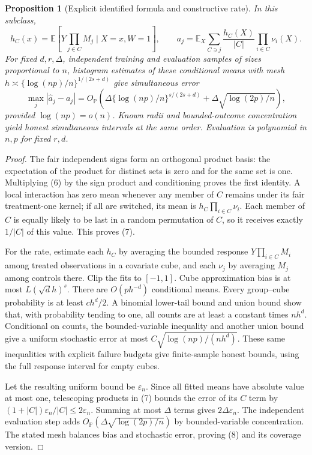 \documentclass[11pt,a4paper]{article}
\newtheorem{proposition}[theorem]{Proposition}
\theoremstyle{definition}
\theoremstyle{remark}
\newcommand{\E}{\mathbb E}
\newcommand{\Prb}{\mathbb P}
\begin{document}
\begin{proposition}[Explicit identified formula and constructive rate]
In this subclass,
\[
 h_C(x)=\E\left[Y\prod_{j\in C}M_j\mid X=x,W=1\right],
 \qquad
 a_j=\E_X\sum_{C\ni j}\frac{h_C(X)}{|C|}\prod_{i\in C}\nu_i(X).
 \tag{7}
\]
For fixed $d,r,\Delta$, independent training and evaluation samples of sizes proportional to $n$, histogram estimates of these conditional means with mesh
$h\asymp\{\log(np)/n\}^{1/(2s+d)}$ give simultaneous error
\[
 \max_j|\hat a_j-a_j|
 =O_{\Prb}\left(\Delta\{\log(np)/n\}^{s/(2s+d)}
       +\Delta\sqrt{\log(2p)/n}\right),
 \tag{8}
\]
provided $\log(np)=o(n)$. Known radii and bounded-outcome concentration yield honest simultaneous intervals at the same order. Evaluation is polynomial in $n,p$ for fixed $r,d$.
\end{proposition}
\begin{proof}
The fair independent signs form an orthogonal product basis: the expectation of the product for distinct sets is zero and for the same set is one. Multiplying (6) by the sign product and conditioning proves the first identity. A local interaction has zero mean whenever any member of $C$ remains under its fair treatment-one kernel; if all are switched, its mean is $h_C\prod_{i\in C}\nu_i$. Each member of $C$ is equally likely to be last in a random permutation of $C$, so it receives exactly $1/|C|$ of this value. This proves (7).

For the rate, estimate each $h_C$ by averaging the bounded response $Y\prod_{i\in C}M_i$ among treated observations in a covariate cube, and each $\nu_j$ by averaging $M_j$ among controls there. Clip the fits to $[-1,1]$. Cube approximation bias is at most $L(\sqrt d h)^s$. There are $O(ph^{-d})$ conditional means. Every group--cube probability is at least $c h^d/2$. A binomial lower-tail bound and union bound show that, with probability tending to one, all counts are at least a constant times $nh^d$. Conditional on counts, the bounded-variable inequality and another union bound give a uniform stochastic error at most $C\sqrt{\log(np)/(nh^d)}$. These same inequalities with explicit failure budgets give finite-sample honest bounds, using the full response interval for empty cubes.

Let the resulting uniform bound be $\varepsilon_n$. Since all fitted means have absolute value at most one, telescoping products in (7) bounds the error of its $C$ term by $(1+|C|)\varepsilon_n/|C|\le2\varepsilon_n$. Summing at most $\Delta$ terms gives $2\Delta\varepsilon_n$. The independent evaluation step adds $O_{\Prb}(\Delta\sqrt{\log(2p)/n})$ by bounded-variable concentration. The stated mesh balances bias and stochastic error, proving (8) and its coverage version.
\end{proof}
\end{document}
